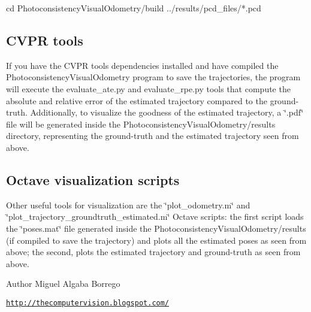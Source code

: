 \begin{DoxyVerb}
cd PhotoconsistencyVisualOdometry/build
../results/pcd_files/*.pcd 
\end{DoxyVerb}


 \hypertarget{index_B}{}\subsection{CVPR tools}\label{index_B}
If you have the CVPR tools dependencies installed and have compiled the PhotoconsistencyVisualOdometry program to save the trajectories, the program will execute the evaluate\_\-ate.py and evaluate\_\-rpe.py tools that compute the absolute and relative error of the estimated trajectory compared to the ground-\/truth. Additionally, to visualize the goodness of the estimated trajectory, a \char`\"{}.pdf\char`\"{} file will be generated inside the PhotoconsistencyVisualOdometry/results directory, representing the ground-\/truth and the estimated trajectory seen from above.

 \hypertarget{index_C}{}\subsection{Octave visualization scripts}\label{index_C}
Other useful tools for visualization are the \char`\"{}plot\_\-odometry.m\char`\"{} and \char`\"{}plot\_\-trajectory\_\-groundtruth\_\-estimated.m\char`\"{} Octave scripts: the first script loads the \char`\"{}poses.mat\char`\"{} file generated inside the PhotoconsistencyVisualOdometry/results (if compiled to save the trajectory) and plots all the estimated poses as seen from above; the second, plots the estimated trajectory and ground-\/truth as seen from above.

  \begin{DoxyAuthor}{Author}
Miguel Algaba Borrego \par
 \href{http://thecomputervision.blogspot.com/}{\tt http://thecomputervision.blogspot.com/} 
\end{DoxyAuthor}
